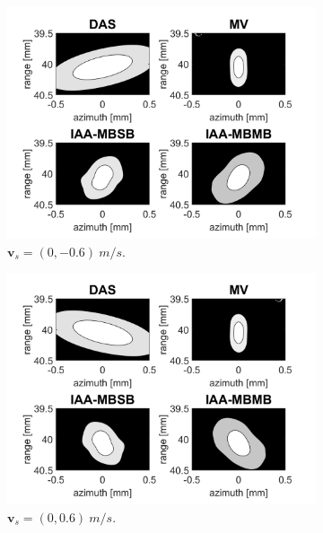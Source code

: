 \begin{figure}[ht]
\begin{subfigure}[t]{0.48\linewidth}
        \includegraphics[width=\linewidth]{./images/results/2.1/motion_90_-06.png}
        \caption{$\boldsymbol{v}_s = (0, -0.6)~m/s$.}
        \label{eq:vertical_towards}
    \end{subfigure}
    \quad
    \begin{subfigure}[t]{0.48\linewidth}
        \includegraphics[width=\linewidth]{./images/results/2.1/motion_90_06.png}
        \caption{$\boldsymbol{v}_s = (0, 0.6)~m/s$.}
        \label{eq:vertical_away}
    \end{subfigure}
    \quad
    \begin{subfigure}[t]{0.48\linewidth}

\end{subfigure}
\end{figure}
